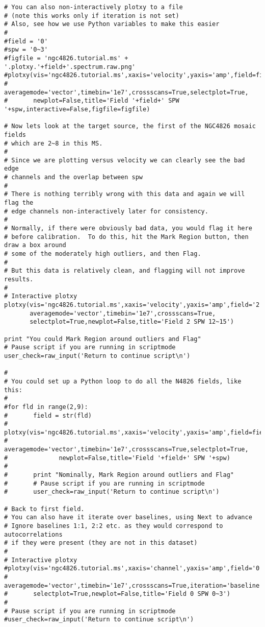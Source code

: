 \begin{verbatim}
# You can also non-interactively plotxy to a file
# (note this works only if iteration is not set)
# Also, see how we use Python variables to make this easier
#
#field = '0'
#spw = '0~3'
#figfile = 'ngc4826.tutorial.ms' + '.plotxy.'+field+'.spectrum.raw.png'
#plotxy(vis='ngc4826.tutorial.ms',xaxis='velocity',yaxis='amp',field=field,spw=spw,
#       averagemode='vector',timebin='1e7',crossscans=True,selectplot=True,
#       newplot=False,title='Field '+field+' SPW '+spw,interactive=False,figfile=figfile)

# Now lets look at the target source, the first of the NGC4826 mosaic fields
# which are 2~8 in this MS.
#
# Since we are plotting versus velocity we can clearly see the bad edge
# channels and the overlap between spw
#
# There is nothing terribly wrong with this data and again we will flag the
# edge channels non-interactively later for consistency.
#
# Normally, if there were obviously bad data, you would flag it here
# before calibration.  To do this, hit the Mark Region button, then draw a box around
# some of the moderately high outliers, and then Flag.
#
# But this data is relatively clean, and flagging will not improve results.
#
# Interactive plotxy
plotxy(vis='ngc4826.tutorial.ms',xaxis='velocity',yaxis='amp',field='2',spw='12~15',
       averagemode='vector',timebin='1e7',crossscans=True,
       selectplot=True,newplot=False,title='Field 2 SPW 12~15')

print "You could Mark Region around outliers and Flag"
# Pause script if you are running in scriptmode
user_check=raw_input('Return to continue script\n')

#
# You could set up a Python loop to do all the N4826 fields, like this:
#
#for fld in range(2,9):
#       field = str(fld)
#       plotxy(vis='ngc4826.tutorial.ms',xaxis='velocity',yaxis='amp',field=field,spw=spw,
#              averagemode='vector',timebin='1e7',crossscans=True,selectplot=True,
#              newplot=False,title='Field '+field+' SPW '+spw)
#
#       print "Nominally, Mark Region around outliers and Flag"
#       # Pause script if you are running in scriptmode
#       user_check=raw_input('Return to continue script\n')

# Back to first field.
# You can also have it iterate over baselines, using Next to advance
# Ignore baselines 1:1, 2:2 etc. as they would correspond to autocorrelations
# if they were present (they are not in this dataset)
#
# Interactive plotxy
#plotxy(vis='ngc4826.tutorial.ms',xaxis='channel',yaxis='amp',field='0',spw='0~3',
#       averagemode='vector',timebin='1e7',crossscans=True,iteration='baseline',
#       selectplot=True,newplot=False,title='Field 0 SPW 0~3')
#       
# Pause script if you are running in scriptmode
#user_check=raw_input('Return to continue script\n')


\end{verbatim}
